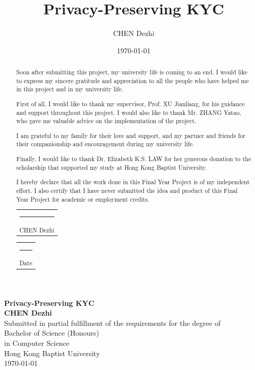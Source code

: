\documentclass[
]{report}
\title{Privacy-Preserving KYC}
\author{CHEN Dezhi}
\date{\today}
\begin{document}
\begin{titlepage}
	\centering
	\vspace*{4.5cm}
	{\LARGE\textbf{Privacy-Preserving KYC}}\\
	\vspace{1.5cm}
	{\Large\textbf{CHEN Dezhi}}\\
	\vspace{1.5cm}
	{\large Submitted in partial fulfillment of the requirements for the degree of} \\
	\vspace{1.0cm}
  {\large Bachelor of Science (Honours) \\
  in Computer Science}\\
	\vspace{1.5cm}
	{\large Hong Kong Baptist University}\\
	\vspace{1.5cm}
	{\large \today}\\
	\vfill
\end{titlepage}

\renewcommand{\abstractname}{Acknowledgements}
\begin{abstract}
Soon after submitting this project, my university life is coming to an end.
I would like to express my sincere gratitude and appreciation to 
all the people who have helped me in this project and in my university
life.

First of all, I would like to thank my supervisor, Prof. XU Jianliang,
for his guidance and support throughout this project. I would also like
to thank Mr. ZHANG Yatao, who gave me valuable advice on the implementation
of the project.

I am grateful to my family for their love and support, and my
partner and friends for their companionship and encouragement during
my university life.

Finally, I would like to thank Dr. Elizabeth K.S. LAW for her generous
donation to the scholarship that supported my study at Hong Kong Baptist
University.
\end{abstract}
  
\renewcommand{\abstractname}{Declaration}
\begin{abstract}
  
I hereby declare that all the work done in this Final Year Project is of
my independent effort. I also certify that I have never submitted the
idea and product of this Final Year Project for academic or employment
credits.

\vspace{5em}

\hfill%
\begin{tabular}[t]{c}
  \rule{10em}{0.4pt}\\ CHEN Dezhi
\end{tabular}%
\hfill%
\begin{tabular}[t]{c}
  \rule{10em}{0.4pt}\\ Date
\end{tabular}%
\hfill\strut
\end{abstract}
\end{document}
